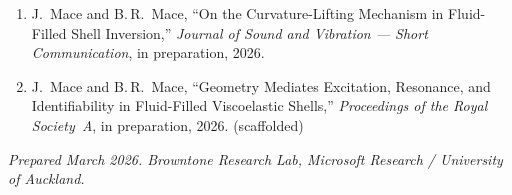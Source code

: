 \documentclass[11pt,a4paper]{article}
\begin{document}
\begin{enumerate}[leftmargin=*]
  \item J.~Mace and B.\,R.~Mace, ``On the Curvature-Lifting Mechanism in Fluid-Filled Shell Inversion,'' \emph{Journal of Sound and Vibration --- Short Communication}, in preparation, 2026.

  \item J.~Mace and B.\,R.~Mace, ``Geometry Mediates Excitation, Resonance, and Identifiability in Fluid-Filled Viscoelastic Shells,'' \emph{Proceedings of the Royal Society~A}, in preparation, 2026. (scaffolded)
\end{enumerate}

\vfill
\begin{center}
  \small\itshape Prepared March 2026. Browntone Research Lab, Microsoft Research / University of Auckland.
\end{center}
\end{document}
